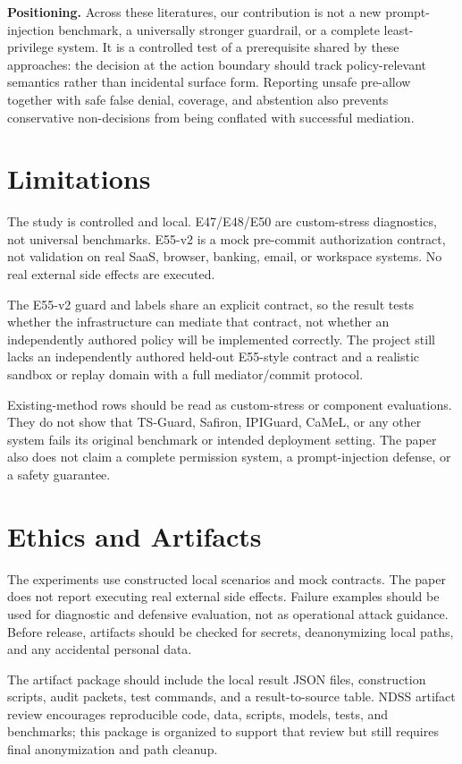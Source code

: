 \documentclass[10pt,twocolumn]{article}
\begin{document}
\textbf{Positioning.}
Across these literatures, our contribution is not a new prompt-injection benchmark, a universally stronger guardrail, or a complete least-privilege system. It is a controlled test of a prerequisite shared by these approaches: the decision at the action boundary should track policy-relevant semantics rather than incidental surface form. Reporting unsafe pre-allow together with safe false denial, coverage, and abstention also prevents conservative non-decisions from being conflated with successful mediation.

\section{Limitations}

The study is controlled and local. E47/E48/E50 are custom-stress diagnostics, not universal benchmarks. E55-v2 is a mock pre-commit authorization contract, not validation on real SaaS, browser, banking, email, or workspace systems. No real external side effects are executed.

The E55-v2 guard and labels share an explicit contract, so the result tests whether the infrastructure can mediate that contract, not whether an independently authored policy will be implemented correctly. The project still lacks an independently authored held-out E55-style contract and a realistic sandbox or replay domain with a full mediator/commit protocol.

Existing-method rows should be read as custom-stress or component evaluations. They do not show that TS-Guard, Safiron, IPIGuard, CaMeL, or any other system fails its original benchmark or intended deployment setting. The paper also does not claim a complete permission system, a prompt-injection defense, or a safety guarantee.

\section{Ethics and Artifacts}

The experiments use constructed local scenarios and mock contracts. The paper does not report executing real external side effects. Failure examples should be used for diagnostic and defensive evaluation, not as operational attack guidance. Before release, artifacts should be checked for secrets, deanonymizing local paths, and any accidental personal data.

The artifact package should include the local result JSON files, construction scripts, audit packets, test commands, and a result-to-source table. NDSS artifact review encourages reproducible code, data, scripts, models, tests, and benchmarks; this package is organized to support that review but still requires final anonymization and path cleanup.
\end{document}
